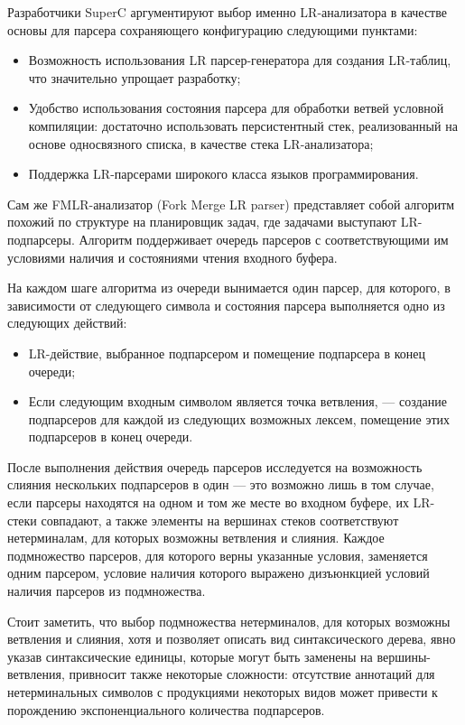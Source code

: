 Разработчики SuperC аргументируют выбор именно LR-анализатора в качестве основы для парсера сохраняющего конфигурацию следующими пунктами:

\begin{itemize}
\item Возможность использования LR парсер-генератора для создания LR-таблиц, что значительно упрощает разработку;
\item Удобство использования состояния парсера для обработки ветвей условной компиляции: достаточно использовать персистентный стек, реализованный на основе односвязного списка, в качестве стека LR-анализатора;
\item Поддержка LR-парсерами широкого класса языков программирования.
\end{itemize}

Сам же FMLR-анализатор (Fork Merge LR parser) представляет собой алгоритм похожий по структуре на планировщик задач, где задачами выступают LR-подпарсеры. Алгоритм поддерживает очередь парсеров с соответствующими им условиями наличия и состояниями чтения входного буфера.

На каждом шаге алгоритма из очереди вынимается один парсер, для которого, в зависимости от следующего символа и состояния парсера выполняется одно из следующих действий:

\begin{itemize}
\item LR-действие, выбранное подпарсером и помещение подпарсера в конец очереди;
\item Если следующим входным символом является точка ветвления, --- создание подпарсеров для каждой из следующих возможных лексем, помещение этих подпарсеров в конец очереди.
\end{itemize}

После выполнения действия очередь парсеров исследуется на возможность слияния нескольких подпарсеров в один --- это возможно лишь в том случае, если парсеры находятся на одном и том же месте во входном буфере, их LR-стеки совпадают, а также элементы на вершинах стеков соответствуют нетерминалам, для которых возможны ветвления и слияния. Каждое подмножество парсеров, для которого верны указанные условия, заменяется одним парсером, условие наличия которого выражено дизъюнкцией условий наличия парсеров из подмножества.

Стоит заметить, что выбор подмножества нетерминалов, для которых возможны ветвления и слияния, хотя и позволяет описать вид синтаксического дерева, явно указав синтаксические единицы, которые могут быть заменены на вершины-ветвления, привносит также некоторые сложности: отсутствие аннотаций для нетерминальных символов с продукциями некоторых видов может привести к порождению экспоненциального количества подпарсеров. 

